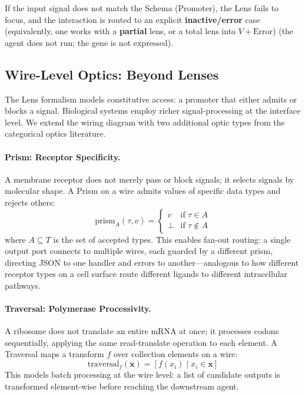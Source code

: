 If the input signal does not match the Schema (Promoter), the Lens fails to focus, and the interaction is routed
to an explicit \textbf{inactive/error} case (equivalently, one works with a \textbf{partial} lens, or a total lens
into $V+\mathrm{Error}$) (the agent does not run; the gene is not expressed).

\subsection{Wire-Level Optics: Beyond Lenses}

The Lens formalism models constitutive access: a promoter that either admits or blocks a signal. Biological systems employ richer signal-processing at the interface level. We extend the wiring diagram with two additional optic types from the categorical optics literature.

\paragraph{Prism: Receptor Specificity.}
A membrane receptor does not merely pass or block signals; it selects signals by molecular shape. A Prism on a wire admits values of specific data types and rejects others:
\begin{equation}
\mathrm{prism}_A(\tau, v) =
\begin{cases}
v & \text{if } \tau \in A \\
\bot & \text{if } \tau \notin A
\end{cases}
\label{eq:prism-optic}
\end{equation}
where $A \subseteq T$ is the set of accepted types. This enables fan-out routing: a single output port connects to multiple wires, each guarded by a different prism, directing JSON to one handler and errors to another---analogous to how different receptor types on a cell surface route different ligands to different intracellular pathways.

\paragraph{Traversal: Polymerase Processivity.}
A ribosome does not translate an entire mRNA at once; it processes codons sequentially, applying the same read-translate operation to each element. A Traversal maps a transform $f$ over collection elements on a wire:
\begin{equation}
\mathrm{traversal}_f(\mathbf{x}) = [f(x_i) \mid x_i \in \mathbf{x}]
\label{eq:traversal-optic}
\end{equation}
This models batch processing at the wire level: a list of candidate outputs is transformed element-wise before reaching the downstream agent.

